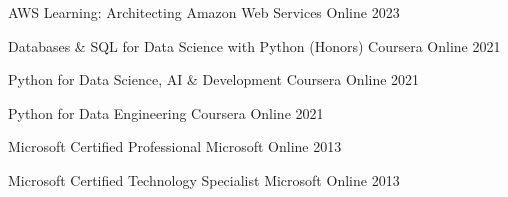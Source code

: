

\begin{cvhonors}

  \cvhonor
    {AWS Learning: Architecting} %
    {Amazon Web Services} %
    {Online} %
    {2023} %

  \cvhonor
    {Databases \& SQL for Data Science with Python (Honors)} %
    {Coursera} %
    {Online} %
    {2021} %

  \cvhonor
    {Python for Data Science, AI \& Development} %
    {Coursera} %
    {Online} %
    {2021} %

  \cvhonor
    {Python for Data Engineering} %
    {Coursera} %
    {Online} %
    {2021} %

  \cvhonor
    {Microsoft Certified Professional} %
    {Microsoft} %
    {Online} %
    {2013} %

  \cvhonor
    {Microsoft Certified Technology Specialist} %
    {Microsoft} %
    {Online} %
    {2013} %

\end{cvhonors}
